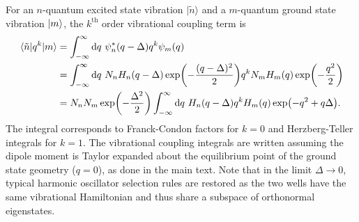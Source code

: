 \documentclass[aip, jcp, reprint, onecolumn, nofootinbib]{revtex4-2}
\begin{document}
For an $n$-quantum excited state vibration $| \tilde{n} \rangle$ and a $m$-quantum ground state vibration $\ket{m}$, the $k^\text{th}$ order vibrational coupling term is
\begin{equation}
	\begin{split}
		\mel{\tilde{n}}{q^k}{m} &= \int_{-\infty}^\infty \mathrm{d}q \ \psi^*_n(q-\Delta) q^k \psi_m(q)\\
		&= \int_{-\infty}^\infty \mathrm{d}q \ N_n H_n(q-\Delta) \exp(-\frac{(q - \Delta)^2}{2}) q^k N_m H_m(q) \exp(-\frac{q^2}{2}) \\
		&= N_n N_m \exp(-\frac{\Delta^2}{2}) \int_{-\infty}^\infty \mathrm{d}q \ H_n(q-\Delta) q^k H_m(q) \exp(-q^2 + q\Delta).
	\end{split}\label{key}
\end{equation}
The integral corresponds to Franck-Condon factors for $k=0$ and Herzberg-Teller integrals for $k=1$.
The vibrational coupling integrals are written assuming the dipole moment is Taylor expanded about the equilibrium point of the ground state geometry ($q=0$), as done in the main text.
Note that in the limit $\Delta \rightarrow 0$, typical harmonic oscillator selection rules are restored as the two wells have the same vibrational Hamiltonian and thus share a subspace of orthonormal eigenstates.
\end{document}
